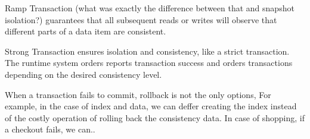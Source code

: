 Ramp Transaction (what was exactly the difference between that and snapshot
isolation?) guarantees that all subsequent reads or writes will observe that
different parts of a data item are consistent.

Strong Transaction ensures isolation and consistency, like a strict transaction. 
The runtime system orders reports transaction success and orders transactions depending on the desired consistency
level.

When a transaction fails to commit, rollback is not the only options, For
example, in the case of index and data, we can deffer creating the index instead
of the costly operation of rolling back the consistency data. In case of
shopping, if a checkout fails, we can..




